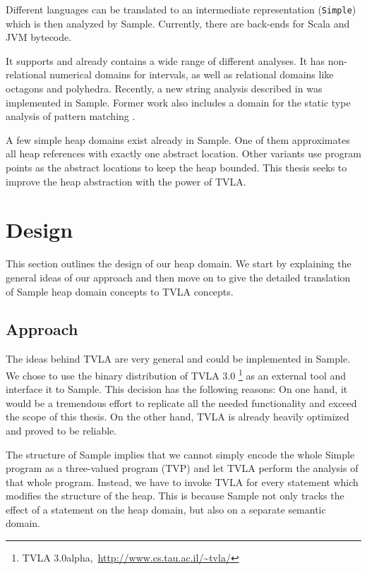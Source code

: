 \documentclass[11pt,a4paper,english]{article}
\begin{document}
Different languages can be translated to an intermediate representation
(\texttt{Simple}) which is then analyzed by Sample. Currently, there are
back-ends for Scala and JVM bytecode.

It supports and already contains a wide range of different analyses. It has
non-relational numerical domains for intervals, as well as relational domains
like octagons and polyhedra. Recently, a new string analysis described in
\cite{CostantiniFerraraCortesi11} was implemented in Sample. Former work also
includes a domain for the static type analysis of pattern matching
\cite{Ferrara10}.

A few simple heap domains exist already in Sample. One of them approximates all
heap references with exactly one abstract location. Other variants use program
points as the abstract locations to keep the heap bounded. This thesis seeks to
improve the heap abstraction with the power of TVLA.

\clearpage
\newpage
\section{Design} 
This section outlines the design of our heap domain. We start by explaining the
general ideas of our approach and then move on to give the detailed translation
of Sample heap domain concepts to TVLA concepts.

\subsection{Approach} 
\label{sct:approach}
The ideas behind TVLA are very general and could be implemented
in Sample. We chose to use the binary distribution of TVLA 3.0 \footnote{TVLA
3.0alpha,\, \url{http://www.cs.tau.ac.il/~tvla/}} as an external tool and
interface it to Sample. This decision has the following reasons: On one hand, it
would be a tremendous effort to replicate all the needed functionality and exceed
the scope of this thesis. On the other hand, TVLA is already heavily optimized
and proved to be reliable. 

The structure of Sample implies that we cannot simply encode the whole Simple
program as a three-valued program (TVP) and let TVLA perform the analysis of
that whole program. Instead, we have to invoke TVLA for every statement which
modifies the structure of the heap. This is because Sample not only tracks the
effect of a statement on the heap domain, but also on a separate semantic
domain.
\end{document}
